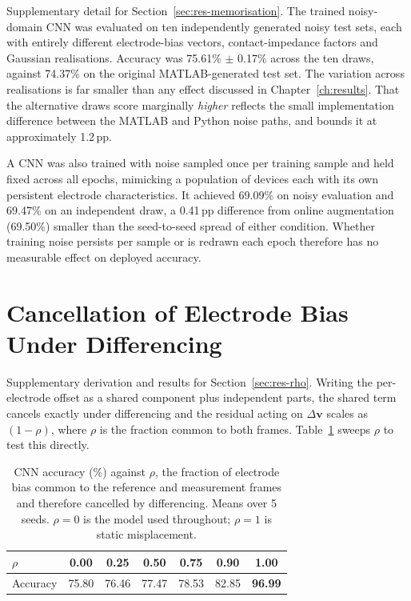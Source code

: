 Supplementary detail for Section~\ref{sec:res-memorisation}. The trained noisy-domain CNN was evaluated on ten independently generated noisy test sets, each with entirely different electrode-bias vectors, contact-impedance factors and Gaussian realisations. Accuracy was 75.61\% $\pm$ 0.17\% across the ten draws, against 74.37\% on the original MATLAB-generated test set. The variation across realisations is far smaller than any effect discussed in Chapter~\ref{ch:results}. That the alternative draws score marginally \emph{higher} reflects the small implementation difference between the MATLAB and Python noise paths, and bounds it at approximately 1.2\,pp.

A CNN was also trained with noise sampled once per training sample and held fixed across all epochs, mimicking a population of devices each with its own persistent electrode characteristics. It achieved 69.09\% on noisy evaluation and 69.47\% on an independent draw, a 0.41\,pp difference from online augmentation (69.50\%) smaller than the seed-to-seed spread of either condition. Whether training noise persists per sample or is redrawn each epoch therefore has no measurable effect on deployed accuracy.

\section{Cancellation of Electrode Bias Under Differencing}
\label{app:rho}

Supplementary derivation and results for Section~\ref{sec:res-rho}. Writing the per-electrode offset as a shared component plus independent parts, the shared term cancels exactly under differencing and the residual acting on $\Delta\mathbf{v}$ scales as $(1-\rho)$, where $\rho$ is the fraction common to both frames. Table~\ref{tab:rho-sweep} sweeps $\rho$ to test this directly.

\begin{table}[htbp]
\centering
\caption[Sensitivity to inter-frame bias cancellation]{CNN accuracy (\%) against $\rho$, the fraction of electrode bias common to the reference and measurement frames and therefore cancelled by differencing. Means over 5 seeds. $\rho = 0$ is the model used throughout; $\rho = 1$ is static misplacement.}
\label{tab:rho-sweep}
\small
\setlength{\tabcolsep}{7pt}
\begin{tabular}{@{}lcccccc@{}}
\toprule
\textbf{$\rho$} & \textbf{0.00} & \textbf{0.25} & \textbf{0.50} & \textbf{0.75} & \textbf{0.90} & \textbf{1.00} \\
\midrule
Accuracy & 75.80 & 76.46 & 77.47 & 78.53 & 82.85 & \textbf{96.99} \\
\bottomrule
\end{tabular}
\end{table}

